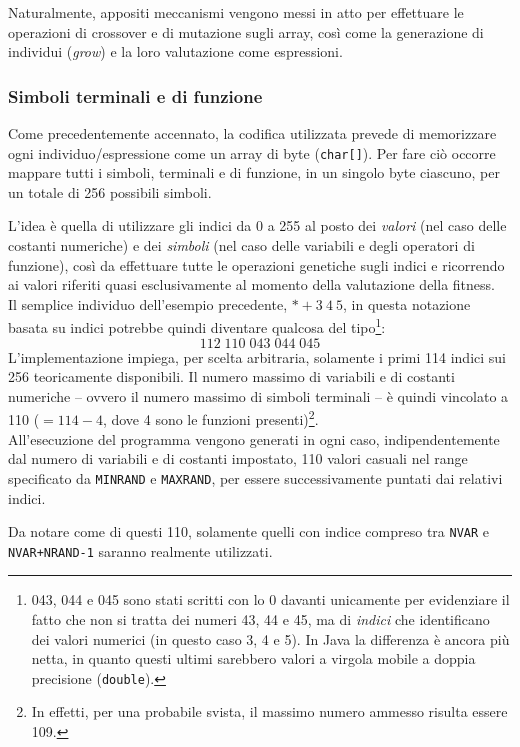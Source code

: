 \documentclass{../llncs}
\newcommand{\java}{\textsf{Java}\xspace}
\begin{document}
Naturalmente, appositi meccanismi vengono messi in atto per effettuare le operazioni di crossover e di mutazione sugli array, così come la generazione di individui (\emph{grow}) e la loro valutazione come espressioni.

\subsubsection{Simboli terminali e di funzione}
Come precedentemente accennato, la codifica utilizzata prevede di memorizzare ogni individuo/espressione come un array di byte (\texttt{char[]}). Per fare ciò occorre mappare tutti i simboli, terminali e di funzione, in un singolo byte ciascuno, per un totale di 256 possibili simboli.

L'idea è quella di utilizzare gli indici da 0 a 255 al posto dei \emph{valori} (nel caso delle costanti numeriche) e dei \emph{simboli} (nel caso delle variabili e degli operatori di funzione), così da effettuare tutte le operazioni genetiche sugli indici e ricorrendo ai valori riferiti quasi esclusivamente al momento della valutazione della fitness.\\

Il semplice individuo dell'esempio precedente, $* + 3\:4\:5$, in questa notazione basata su indici potrebbe quindi diventare qualcosa del tipo\footnote{043, 044 e 045 sono stati scritti con lo 0 davanti unicamente per evidenziare il fatto che non si tratta dei numeri 43, 44 e 45, ma di \emph{indici} che identificano dei valori numerici (in questo caso 3, 4 e 5). In \java la differenza è ancora più netta, in quanto questi ultimi sarebbero valori a virgola mobile a doppia precisione (\texttt{double}).}:
\[
112\;110\;043\;044\;045
\]
L'implementazione impiega, per scelta arbitraria, solamente i primi 114 indici sui 256 teoricamente disponibili. Il numero massimo di variabili e di costanti numeriche -- ovvero il numero massimo di simboli terminali -- è quindi vincolato a 110 ($=114-4$, dove 4 sono le funzioni presenti)\footnote{In effetti, per una probabile svista, il massimo numero ammesso risulta essere 109.}.\\

All'esecuzione del programma vengono generati in ogni caso, indipendentemente dal numero di variabili e di costanti impostato, 110 valori casuali nel range specificato da \texttt{MINRAND} e \texttt{MAXRAND}, per essere successivamente puntati dai relativi indici.

Da notare come di questi 110, solamente quelli con indice compreso tra \texttt{NVAR} e \texttt{NVAR+NRAND-1} saranno realmente utilizzati.
\end{document}
